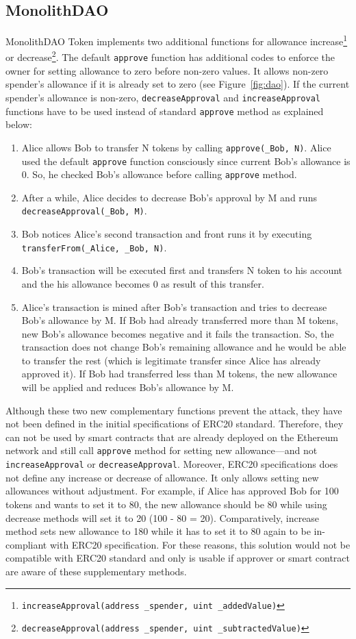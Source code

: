 \subsection{MonolithDAO}
MonolithDAO Token\cite{Ref12} implements two additional functions for allowance increase\footnote{\texttt{increaseApproval(address \_spender, uint \_addedValue)}} or decrease\footnote{\texttt{decreaseApproval(address \_spender, uint \_subtractedValue)}}. The default \texttt{approve} function has additional codes to enforce the owner for setting allowance to zero before non-zero values. It allows non-zero spender's allowance if it is already set to zero (see Figure~\ref{fig:dao}). If the current spender’s allowance is non-zero, \texttt{decreaseApproval} and \texttt{increaseApproval} functions have to be used instead of standard \texttt{approve} method as explained below:
\begin{enumerate}
	\item Alice allows Bob to transfer N tokens by calling \texttt{approve(\_Bob, N)}. Alice used the default \texttt{approve} function consciously since current Bob’s allowance is 0. So, he checked Bob's allowance before calling \texttt{approve} method.
	\item After a while, Alice decides to decrease Bob’s approval by M and runs \texttt{decreaseApproval(\_Bob, M)}.
	\item Bob notices Alice’s second transaction and front runs it by executing \texttt{transferFrom(\_Alice, \_Bob, N)}.
	\item Bob’s transaction will be executed first and transfers N token to his account and the his allowance becomes 0 as result of this transfer.
	\item Alice’s transaction is mined after Bob’s transaction and tries to decrease Bob’s allowance by M. If Bob had already transferred more than M tokens, new Bob’s allowance becomes negative and it fails the transaction. So, the transaction does not change Bob’s remaining allowance and he would be able to transfer the rest (which is legitimate transfer since Alice has already approved it). If Bob had transferred less than M tokens, the new allowance will be applied and reduces Bob’s allowance by M.
\end{enumerate}
\noindent Although these two new complementary functions prevent the attack, they have not been defined in the initial specifications of ERC20 standard. Therefore, they can not be used by smart contracts that are already deployed on the Ethereum network and still call \texttt{approve} method for setting new allowance---and not \texttt{increaseApproval} or \texttt{decreaseApproval}. Moreover, ERC20 specifications does not define any increase or decrease of allowance. It only allows setting new allowances without adjustment. For example, if Alice has approved Bob for 100 tokens and wants to set it to 80, the new allowance should be 80 while using decrease methods will set it to 20 (100 - 80 = 20). Comparatively, increase method sets new allowance to 180 while it has to set it to 80 again to be in-compliant with ERC20 specification. For these reasons, this solution would not be compatible with ERC20 standard and only is usable if approver or smart contract are aware of these supplementary methods.


